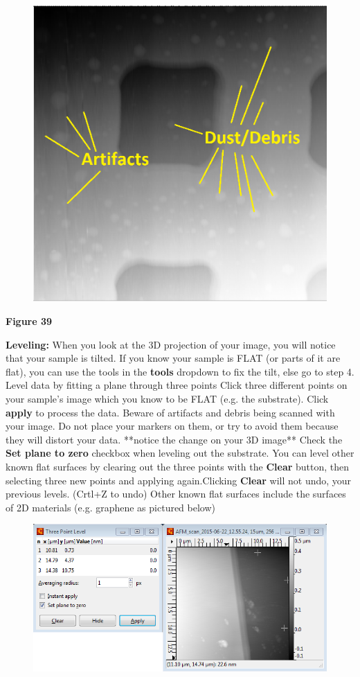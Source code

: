 \documentclass{../lab}
\begin{document}
\begin{figure}[h]
    \centering
    \href{http://dev-physicsadv.pantheon.berkeley.edu/sites/default/files/AFMImages/43.png}{\includegraphics[width=0.5\linewidth]{images/43.png}}
    \caption{}
    \label{fig:43}
\end{figure}


\textbf{Figure 39}

\textbf{Leveling:} When you look at the 3D projection of your image, you will notice that your sample is tilted.  If you know your sample is FLAT (or parts of it are flat), you can use the tools in the \textbf{tools} dropdown to fix the tilt, else go to step 4.
 Level data by fitting a plane through three points
Click three different points on your sample's image which you know to be FLAT (e.g. the substrate). Click \textbf{apply} to process the data.
Beware of artifacts and debris being scanned with your image.  Do not place your markers on them, or try to avoid them because they will distort your data.
**notice the change on your 3D image**
Check the \textbf{Set plane to zero} checkbox when leveling out the substrate.
You can level other known flat surfaces by clearing out the three points with the \textbf{Clear} button, then selecting three new points and applying again.Clicking \textbf{Clear} will not undo, your previous levels. (Crtl+Z to undo)
Other known flat surfaces include the surfaces of 2D materials (e.g. graphene as pictured below)




\begin{figure}[h]
    \centering
    \href{http://dev-physicsadv.pantheon.berkeley.edu/sites/default/files/AFMImages/45.png}{\includegraphics[width=0.5\linewidth]{images/45.png}}
    \caption{}
    \label{fig:45}
\end{figure}
\end{document}
